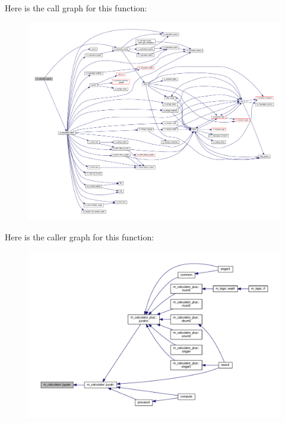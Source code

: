 Here is the call graph for this function\+:
\nopagebreak
\begin{figure}[H]
\begin{center}
\leavevmode
\includegraphics[width=350pt]{namespacem__calculator_a183990dad923a0e1338b0df538c3fec8_cgraph}
\end{center}
\end{figure}
Here is the caller graph for this function\+:
\nopagebreak
\begin{figure}[H]
\begin{center}
\leavevmode
\includegraphics[width=350pt]{namespacem__calculator_a183990dad923a0e1338b0df538c3fec8_icgraph}
\end{center}
\end{figure}
\mbox{\label{namespacem__calculator_ae1afc2ee970ad4635cce19b9b8b74f1c}} 
